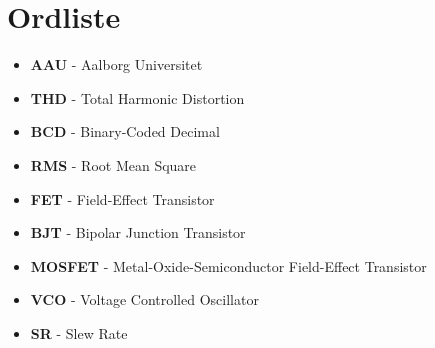 \section*{Ordliste}
\begin{itemize}
\item \textbf{AAU} - Aalborg Universitet
\item \textbf{THD} - Total Harmonic Distortion
\item \textbf{BCD} - Binary-Coded Decimal
\item \textbf{RMS} - Root Mean Square
\item \textbf{FET} - Field-Effect Transistor
\item \textbf{BJT} - Bipolar Junction Transistor
\item \textbf{MOSFET} - Metal-Oxide-Semiconductor Field-Effect Transistor
\item \textbf{VCO} - Voltage Controlled Oscillator
\item \textbf{SR} - Slew Rate
\end{itemize}

\newpage